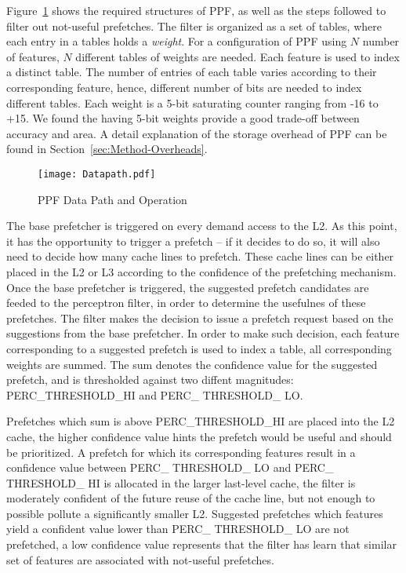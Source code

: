 Figure~\ref{fig:PPF_Datapath} shows the required structures of PPF, as well as the
steps followed to filter out not-useful prefetches.
The filter is organized as a set of tables, where each entry in a tables holds 
a \textit{weight}. For a configuration of PPF using $N$ number of features, 
$N$ different tables of weights are needed. Each feature is used to index 
a distinct table. The number of entries of each table varies according
to their corresponding feature, hence, different
number of bits are needed to index different tables.
Each weight is a 5-bit saturating counter ranging from -16 to +15. 
We found the having 5-bit weights provide a good trade-off 
between accuracy and area. A detail explanation of the storage overhead of
PPF can be found in Section~\ref{sec:Method-Overheads}.

\begin{figure}
  \begin{center}
  \texttt{[image: Datapath.pdf]}
    \label{fig:PPF_Datapath}
  \caption{PPF Data Path and Operation}
  \end{center}
\end{figure}


\newline 


The base prefetcher is triggered on every demand access to the L2.  
As this point, it has the opportunity to trigger a prefetch  -- if it 
decides to do so, it will also need to decide how many cache lines
to prefetch.  These cache lines can be either placed in the L2 or
L3 according to the confidence of the prefetching mechanism.
Once the base prefetcher is triggered, the suggested
prefetch candidates are feeded to the perceptron filter, 
in order to determine the usefulnes of these prefetches.  
The filter makes the decision to issue a prefetch request based on 
the suggestions from the base prefetcher.
In order to make such decision, each feature corresponding to a 
suggested prefetch is used to index a table, 
all corresponding weights are summed. 
The sum denotes the confidence value for the suggested prefetch, 
and is thresholded against two diffent magnitudes:  
PERC\_THRESHOLD\_HI and PERC\_ THRESHOLD\_ LO. 

Prefetches which sum is above PERC\_THRESHOLD\_HI
are placed into the L2 cache, the higher confidence value
hints the prefetch would be useful and should be prioritized.
A prefetch for which its corresponding features result 
in a confidence value between  
PERC\_ THRESHOLD\_ LO and PERC\_ THRESHOLD\_ HI is allocated in the larger 
last-level cache, the filter is moderately confident of the future reuse of the 
cache line, but not enough to possible pollute a significantly smaller L2. 
Suggested prefetches which features yield a confident value lower than 
PERC\_ THRESHOLD\_ LO are not prefetched, a low confidence value 
represents that the filter has learn that similar set of features
are associated with not-useful prefetches. \newline 


